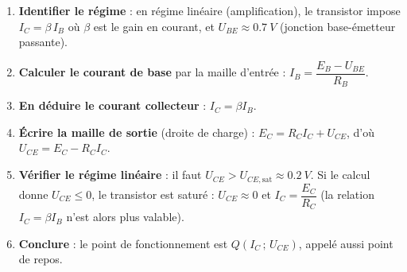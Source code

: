 \documentclass[11pt]{article}
\newcommand{\cle}[1]{{\popxbold\color{popdark}#1}}
\begin{document}
\begin{methode}
\begin{enumerate}
\item \textbf{Identifier le régime} : en régime linéaire (amplification), le transistor impose $I_C = \beta\, I_B$ où $\beta$ est le gain en courant, et $U_{BE} \approx \SI{0,7}{V}$ (jonction base-émetteur passante).
\item \textbf{Calculer le courant de base} par la maille d'entrée : $I_B = \dfrac{E_B - U_{BE}}{R_B}$.
\item \textbf{En déduire le courant collecteur} : $I_C = \beta I_B$.
\item \textbf{Écrire la maille de sortie} (droite de charge) : $E_C = R_C I_C + U_{CE}$, d'où $U_{CE} = E_C - R_C I_C$.
\item \textbf{Vérifier le régime linéaire} : il faut $U_{CE} > U_{CE,\text{sat}} \approx \SI{0,2}{V}$. Si le calcul donne $U_{CE} \leq 0$, le transistor est \cle{saturé} : $U_{CE} \approx 0$ et $I_C = \dfrac{E_C}{R_C}$ (la relation $I_C = \beta I_B$ n'est alors plus valable).
\item \textbf{Conclure} : le point de fonctionnement est $Q(I_C\,;\,U_{CE})$, appelé aussi point de repos.
\end{enumerate}
\end{methode}
\end{document}
